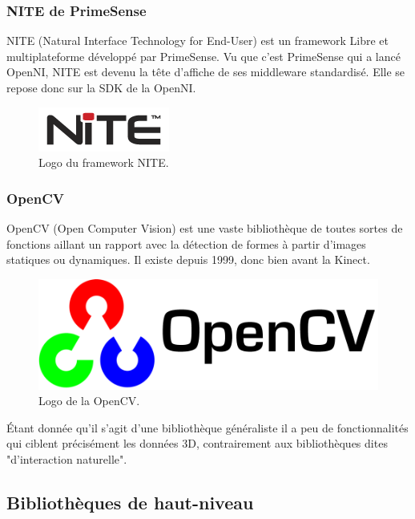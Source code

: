 \subsubsection{NITE de PrimeSense}
NITE (Natural Interface Technology for End-User) est un framework Libre et 
multiplateforme développé par PrimeSense. Vu que c'est PrimeSense qui a 
lancé OpenNI, NITE est devenu la tête d'affiche de ses
middleware standardisé. Elle se repose donc sur la SDK de la OpenNI. 
\begin{figure}[h!]
\centering
\includegraphics[width=0.3\linewidth]{images/nite_logo}
\caption{Logo du framework NITE.}
\end{figure}

\subsubsection{OpenCV}
OpenCV (Open Computer Vision) est une vaste bibliothèque de toutes sortes de 
fonctions aillant un rapport avec la détection de formes à partir d'images
statiques ou dynamiques. Il existe depuis 1999, donc bien avant la Kinect.
\begin{figure}[h!]
\centering
\includegraphics[width=0.4\linewidth]{images/opencv_logo}
\caption{Logo de la OpenCV.}
\end{figure}
Étant donnée qu'il s'agit d'une bibliothèque généraliste il a peu de 
fonctionnalités qui ciblent précisément les données 3D, contrairement aux 
bibliothèques dites "d'interaction naturelle".


\subsection{Bibliothèques de haut-niveau}

